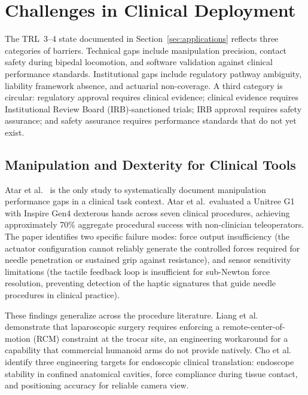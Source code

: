 ﻿%
\section{Challenges in Clinical Deployment}
\label{sec:challenges}

The TRL~3--4 state documented in Section~\ref{sec:applications} reflects three
categories of barriers. Technical gaps include manipulation precision, contact
safety during bipedal locomotion, and software validation against clinical
performance standards. Institutional gaps include regulatory pathway ambiguity,
liability framework absence, and actuarial non-coverage. A third category is
circular: regulatory approval requires clinical evidence; clinical evidence
requires Institutional Review Board (IRB)-sanctioned trials; IRB approval
requires safety assurance; and safety assurance requires performance standards
that do not yet exist.

\subsection{Manipulation and Dexterity for Clinical Tools}
\label{sec:manipulation}

Atar et al.~\cite{atar2025humanoids} is the only study to systematically document
manipulation performance gaps in a clinical task context. Atar et al.\ evaluated
a Unitree G1 with Inspire Gen4 dexterous hands across seven clinical procedures,
achieving approximately 70\% aggregate procedural success with non-clinician
teleoperators. The paper identifies two specific failure modes: force output
insufficiency (the actuator configuration cannot reliably generate the controlled
forces required for needle penetration or sustained grip against resistance), and
sensor sensitivity limitations (the tactile feedback loop is insufficient for
sub-Newton force resolution, preventing detection of the haptic signatures that
guide needle procedures in clinical practice).

These findings generalize across the procedure literature. Liang et
al.~\cite{liang2025lapsurgie} demonstrate that laparoscopic surgery requires
enforcing a remote-center-of-motion (RCM) constraint at the trocar site, an
engineering workaround for a capability that commercial humanoid arms do not
provide natively. Cho et al.~\cite{cho2026humanoid} identify three engineering
targets for endoscopic clinical translation: endoscope stability in confined
anatomical cavities, force compliance during tissue contact, and positioning
accuracy for reliable camera view.

